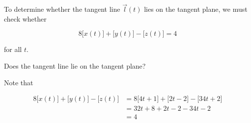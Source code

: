\documentclass{ximera}
\begin{document}
\begin{exercise}
\begin{exercise}
\begin{exercise}
To determine whether the tangent line $\vec{l}(t)$ lies on the tangent plane, we must check whether

\[
8\big[x(t)\big]+\big[y(t)\big]-\big[z(t)\big] = 4
\]

for all $t$.  

Does the tangent line lie on the tangent plane?  

\begin{feedback}[correct]
Note that 

\begin{align*}
8\big[x(t)\big]+\big[y(t)\big]-\big[z(t)\big] & = 8\big[4t+1\big]+\big[2t-2\big]-\big[34t+2\big]\\
&= 32t+8+2t-2-34t-2 \\
&=4
\end{align*}
\end{feedback}


\end{exercise}
\end{exercise}
\end{exercise}
\end{document}
